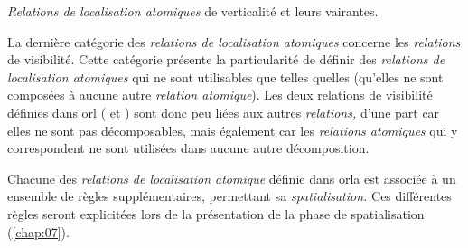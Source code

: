 \begin{table}
  \centering
  
  \caption{\emph{Relations de localisation atomiques} de verticalité
    et leurs vairantes.}
  \label{tab:atomique_vertical}
\end{table}

La dernière catégorie des \emph{relations de localisation atomiques}
concerne les \emph{relations} de visibilité. Cette catégorie présente
la particularité de définir des \emph{relations de localisation
  atomiques} qui ne sont utilisables que telles quelles (\ie qu'elles
ne sont composées à aucune autre \emph{relation atomique}). Les deux
relations de visibilité définies dans \ac{orl} (\ie
{} et
) sont donc peu liées aux autres
\emph{relations,} d'une part car elles ne sont pas décomposables, mais
également car les \emph{relations atomiques} qui y correspondent ne
sont utilisées dans aucune autre décomposition.

Chacune des \emph{relations de localisation atomique} définie dans
\ac{orla} est associée à un ensemble de règles supplémentaires,
permettant sa \emph{spatialisation.} Ces différentes règles seront
explicitées lors de la présentation de la phase de spatialisation
(\autoref{chap:07}).


